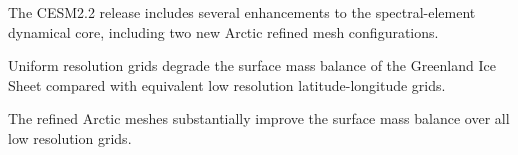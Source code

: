 \documentclass[draft]{agujournal2019}
\begin{document}





\begin{keypoints}
\item The CESM2.2 release includes several enhancements to the spectral-element dynamical core, including two new Arctic refined mesh configurations.
\item Uniform resolution grids degrade the surface mass balance of the Greenland Ice Sheet compared with equivalent low resolution latitude-longitude grids.
\item The refined Arctic meshes substantially improve the surface mass balance over all low resolution grids.
\end{keypoints}

%
%

%
%
\end{document}
